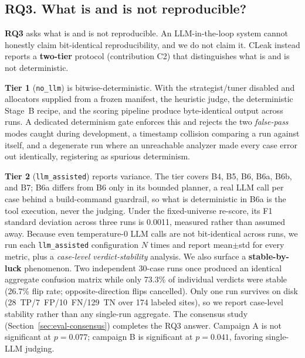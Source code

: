 \documentclass[a4paper]{llncs}
\begin{document}
\noindent{}

\subsection{RQ3. What is and is not reproducible?}
\label{sec:reproducibility}

\textbf{RQ3} asks what is and is not reproducible. An LLM-in-the-loop
system cannot honestly claim bit-identical reproducibility, and we do
not claim it. CLeak instead reports a
\textbf{two-tier} protocol (contribution C2) that distinguishes what is
and is not deterministic.

\textbf{Tier 1} (\texttt{no\_llm}) is bitwise-deterministic. With the
strategist/tuner disabled and allocators supplied from a frozen manifest,
the heuristic judge, the deterministic Stage~B recipe, and the scoring
pipeline produce byte-identical output across runs. A dedicated
determinism gate enforces this and rejects the two
\emph{false-pass} modes caught during development, a timestamp
collision comparing a run against itself, and a
degenerate run where an unreachable analyzer made every case error out
identically, registering as spurious determinism.

\textbf{Tier 2} (\texttt{llm\_assisted}) reports variance. The tier
covers B4, B5, B6, B6a, B6b, and B7; B6a differs from B6 only in its
bounded planner, a real LLM call per case behind a build-command
guardrail, so what is deterministic in B6a is the tool execution, never
the judging. Under the fixed-universe re-score, its F1 standard deviation
across three runs is 0.0011, measured rather than assumed away. Because
even temperature-0 LLM calls are not bit-identical across runs, we
run each \texttt{llm\_assisted} configuration $N$ times and report
mean$\pm$std for every metric, plus a \emph{case-level
verdict-stability} analysis.
We also surface a
\textbf{stable-by-luck} phenomenon. Two independent 30-case runs once
produced an identical aggregate confusion matrix while only
73.3\% of individual verdicts were stable (26.7\% flip rate;
opposite-direction flips cancelled). Only one run survives on disk
(28~TP/7~FP/10~FN/129~TN over 174 labeled sites), so we report
case-level stability rather than any single-run aggregate. The
consensus study (Section~\ref{sec:eval-consensus}) completes the RQ3
answer. Campaign A is not significant at
$p{=}0.077$; campaign B is significant at $p{=}0.041$, favoring
single-LLM judging.
\end{document}
